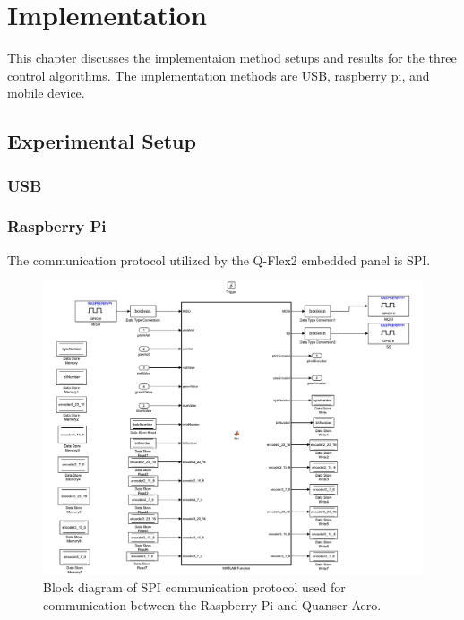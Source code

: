\chapter{Implementation}
\label{ch: Chapter5}
This chapter discusses the implementaion method setups and results for the three control algorithms.  The implementation methods are USB, raspberry pi, and mobile device.
\section{Experimental Setup}
\subsection{USB}


\subsection{Raspberry Pi}
The communication protocol utilized by the Q-Flex2 embedded panel is SPI.  
\begin{figure}[!htbp]
    \centering
    \includegraphics[width=.46\textwidth,keepaspectratio=true]{figs/img/SPI_COM.pdf}
    \caption{Block diagram of SPI communication protocol used for communication between the Raspberry Pi and Quanser Aero.}
    \label{fig:SPI_COM}
\end{figure}


